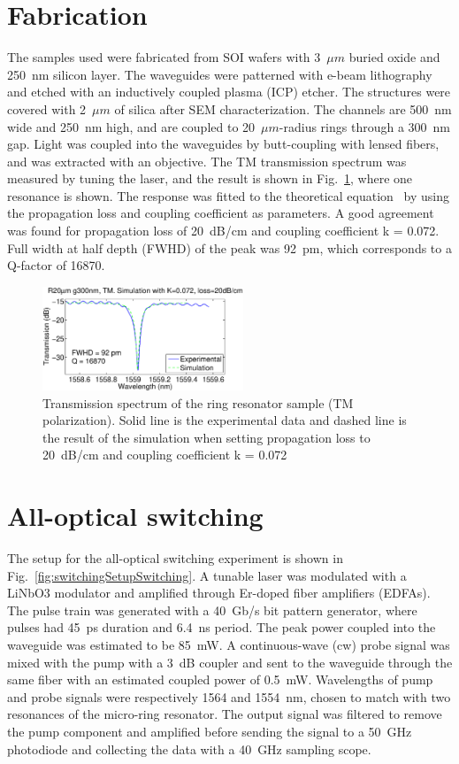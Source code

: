 \documentclass[twocolumn]{el-author}
\begin{document}
\section{Fabrication}
The samples used were fabricated from SOI wafers with 3~$\mu m$ buried oxide and 250~nm silicon layer. The waveguides were patterned with e-beam lithography and etched with an inductively coupled plasma (ICP) etcher. The structures were covered with 2~$\mu m$ of silica after SEM characterization. The channels are 500~nm wide and 250~nm high, and are coupled to 20~$\mu m$-radius rings through a 300~nm gap. Light was coupled into the waveguides by butt-coupling with lensed fibers, and was extracted with an objective. The TM transmission spectrum was measured by tuning the laser, and the result is shown in Fig.~\ref{fig:fit20um300nmBig}, where one resonance is shown. The response was fitted to the theoretical equation~\cite{heebner2007optical} by using the propagation loss and coupling coefficient as parameters. A good agreement was found for propagation loss of 20~dB/cm and coupling coefficient k = 0.072. Full width at half depth (FWHD) of the peak was 92~pm, which corresponds to a Q-factor of 16870. 


\begin{figure}[htb]
    \centering
    \includegraphics[width=60mm]{fit20um300nmBig_2}   
    \caption{Transmission spectrum of the ring resonator sample (TM polarization). Solid line is the experimental data and dashed line is the result of the simulation when setting propagation loss to 20~dB/cm and coupling coefficient k = 0.072}
    \label{fig:fit20um300nmBig}
\end{figure}



\section{All-optical switching}
The setup for the all-optical switching experiment is shown in Fig.~\ref{fig:switchingSetupSwitching}. A tunable laser was modulated with a LiNbO3 modulator and amplified through Er-doped fiber amplifiers (EDFAs). The pulse train was generated with a 40~Gb/s bit pattern generator, where pulses had 45~ps duration and 6.4~ns period. The peak power coupled into the waveguide was estimated to be 85~mW. A continuous-wave (cw) probe signal was mixed with the pump with a 3~dB coupler and sent to the waveguide through the same fiber with an estimated coupled power of 0.5~mW. Wavelengths of pump and probe signals were respectively 1564 and 1554~nm, chosen to match with two resonances of the micro-ring resonator. The output signal was filtered to remove the pump component and amplified before sending the signal to a 50~GHz photodiode and collecting the data with a 40~GHz sampling scope.
\end{document}
